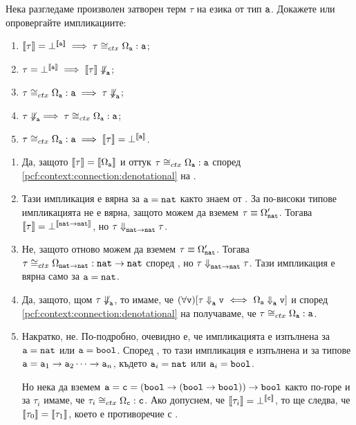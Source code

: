 \begin{problem}
  Нека разгледаме произволен затворен терм $\tau$ на езика \PCFBOOL от тип $\texttt{a}$. 
  Докажете или опровергайте импликациите:
  \begin{enumerate}[(1)]
  \item
    $\llbracket{\tau}\rrbracket = \bot^{\llbracket{\texttt{a}}\rrbracket} \implies \tau \cong_{ctx} \Omega_{\texttt{a}} : \texttt{a}$;
  \item
    $\tau = \bot^{\llbracket{\texttt{a}}\rrbracket} \implies \llbracket{\tau}\rrbracket \not\Downarrow^{}_{\texttt{a}}$;
  \item
    $\tau \cong_{ctx} \Omega_{\texttt{a}} : \texttt{a} \implies \tau \not\Downarrow^{}_{\texttt{a}}$;
  \item
    $\tau \not\Downarrow^{}_{\texttt{a}} \implies \tau \cong_{ctx} \Omega_{\texttt{a}} : \texttt{a}$;
  \item
    $\tau \cong_{ctx} \Omega_{\texttt{a}} : \texttt{a} \implies \llbracket{\tau}\rrbracket = \bot^{\llbracket{\texttt{a}}\rrbracket}$.
  \end{enumerate}
\end{problem}
\begin{hint}
  \begin{enumerate}[(1)]
  \item
    Да, защото $\llbracket{\tau}\rrbracket = \llbracket{\Omega_{\texttt{a}}}\rrbracket$ и оттук $\tau \cong_{ctx} \Omega_{\texttt{a}} : \texttt{a}$
    според \ref{pcf:context:connection:denotational} на .
  \item
    Тази импликация е вярна за $\texttt{a} = \texttt{nat}$ както знаем от .
    За по-високи типове импликацията не е вярна, защото можем да вземем $\tau \equiv \Omega'_{\texttt{nat}}$.
    Тогава $\llbracket{\tau}\rrbracket = \bot^{\llbracket{\texttt{nat}\to\texttt{nat}}\rrbracket}$, но $\tau \Downarrow^{}_{\texttt{nat}\to\texttt{nat}} \tau$.
  \item
    Не, защото отново можем да вземем $\tau \equiv \Omega'_{\texttt{nat}}$.
    Тогава $\tau \cong_{ctx} \Omega_{\texttt{nat}\to\texttt{nat}} : \texttt{nat}\to\texttt{nat}$ според , но $\tau \Downarrow^{}_{\texttt{nat}\to\texttt{nat}} \tau$.
    Тази импликация е вярна само за $\texttt{a} = \texttt{nat}$.
  \item
    Да, защото, щом $\tau \not\Downarrow^{}_{\texttt{a}}$, то имаме, че
    $(\forall \texttt{v})[\tau \Downarrow^{}_{\texttt{a}} \texttt{v} \ \Longleftrightarrow\  \Omega_{\texttt{a}} \Downarrow^{}_{\texttt{a}} \texttt{v}]$
    и според \ref{pcf:context:connection:denotational} на 
    получаваме, че $\tau \cong_{ctx} \Omega_{\texttt{a}} : \texttt{a}$.
  \item
    Накратко, не. По-подробно, очевидно е, че импликацията е изпълнена за $\texttt{a} = \texttt{nat}$ или $\texttt{a} = \texttt{bool}$.
    Според , то тази импликация е изпълнена и за
    типове $\texttt{a} = \texttt{a}_1 \to \texttt{a}_2 \cdots \to \texttt{a}_n$, където $\texttt{a}_i = \texttt{nat}$ или $\texttt{a}_i = \texttt{bool}$.
    
    Но нека да вземем $\texttt{a} = \texttt{c} = (\texttt{bool} \to (\texttt{bool} \to \texttt{bool}))\to\texttt{bool}$ както по-горе и за $\tau_i$ имаме, че $\tau_i \cong_{ctx} \Omega_{\texttt{c}} : \texttt{c}$.
    Ако допуснем, че $\llbracket{\tau_i}\rrbracket = \bot^{\llbracket{\texttt{c}}\rrbracket}$, то ще следва, че $\llbracket{\tau_0}\rrbracket = \llbracket{\tau_1}\rrbracket$,
    което е противоречие с .    
  \end{enumerate}
\end{hint}

